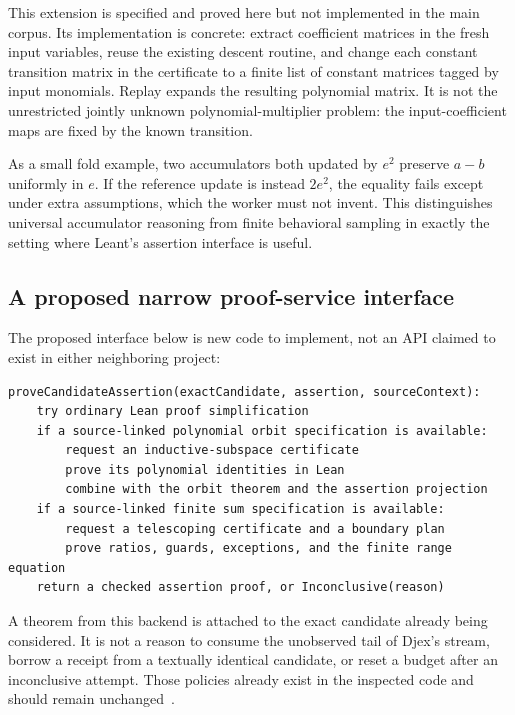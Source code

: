 \documentclass[11pt,letterpaper]{article}
\theoremstyle{definition}\newtheorem{definition}[theorem]{Definition}
\theoremstyle{remark}\newtheorem{remark}[theorem]{Remark}
\begin{document}
This extension is specified and proved here but not implemented in the main
corpus. Its implementation is concrete: extract coefficient matrices in the
fresh input variables, reuse the existing descent routine, and change each
constant transition matrix in the certificate to a finite list of constant
matrices tagged by input monomials. Replay expands the resulting polynomial
matrix. It is not the unrestricted jointly unknown polynomial-multiplier
problem: the input-coefficient maps are fixed by the known transition.

As a small fold example, two accumulators both updated by $e^2$ preserve
$a-b$ uniformly in $e$. If the reference update is instead $2e^2$, the equality
fails except under extra assumptions, which the worker must not invent.
This distinguishes universal accumulator reasoning from finite behavioral
sampling in exactly the setting where Leant's assertion interface is useful.

\subsection{A proposed narrow proof-service interface}
The proposed interface below is new code to implement, not an API claimed to
exist in either neighboring project:
\par\noindent\begin{minipage}{\linewidth}
\begin{lstlisting}
proveCandidateAssertion(exactCandidate, assertion, sourceContext):
    try ordinary Lean proof simplification
    if a source-linked polynomial orbit specification is available:
        request an inductive-subspace certificate
        prove its polynomial identities in Lean
        combine with the orbit theorem and the assertion projection
    if a source-linked finite sum specification is available:
        request a telescoping certificate and a boundary plan
        prove ratios, guards, exceptions, and the finite range equation
    return a checked assertion proof, or Inconclusive(reason)
\end{lstlisting}
\end{minipage}\par\smallskip

A theorem from this backend is attached to the exact candidate already being
considered. It is not a reason to consume the unobserved tail of Djex's stream,
borrow a receipt from a textually identical candidate, or reset a budget after
an inconclusive attempt. Those policies already exist in the inspected code
and should remain unchanged~\cite{leant-behavior,djex-stream}.
\end{document}
